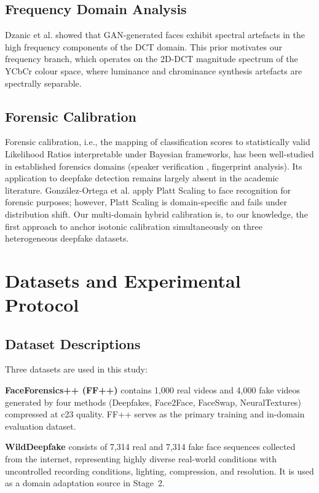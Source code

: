 \documentclass[journal]{IEEEtran}
\begin{document}
\subsection{Frequency Domain Analysis}
Dzanic et al. \cite{Dzanic2020} showed that GAN-generated faces exhibit spectral artefacts in the high frequency components of the DCT domain. This prior motivates our frequency branch, which operates on the 2D-DCT magnitude spectrum of the YCbCr colour space, where luminance and chrominance synthesis artefacts are spectrally separable.

\subsection{Forensic Calibration}
Forensic calibration, i.e., the mapping of classification scores to statistically valid Likelihood Ratios interpretable under Bayesian frameworks, has been well-studied in established forensics domains (speaker verification \cite{Brummer2006}, fingerprint analysis). Its application to deepfake detection remains largely absent in the academic literature. González-Ortega et al. \cite{GonzalezOrtega2022} apply Platt Scaling to face recognition for forensic purposes; however, Platt Scaling is domain-specific and fails under distribution shift. Our multi-domain hybrid calibration is, to our knowledge, the first approach to anchor isotonic calibration simultaneously on three heterogeneous deepfake datasets.

\section{Datasets and Experimental Protocol}
\label{sec:datasets}

\subsection{Dataset Descriptions}
Three datasets are used in this study:

\textbf{FaceForensics++ (FF++)} \cite{Rossler2019} contains 1,000 real videos and 4,000 fake videos generated by four methods (Deepfakes, Face2Face, FaceSwap, NeuralTextures) compressed at c23 quality. FF++ serves as the primary training and in-domain evaluation dataset.

\textbf{WildDeepfake} \cite{Zi2020} consists of 7,314 real and 7,314 fake face sequences collected from the internet, representing highly diverse real-world conditions with uncontrolled recording conditions, lighting, compression, and resolution. It is used as a domain adaptation source in Stage~2.
\end{document}
